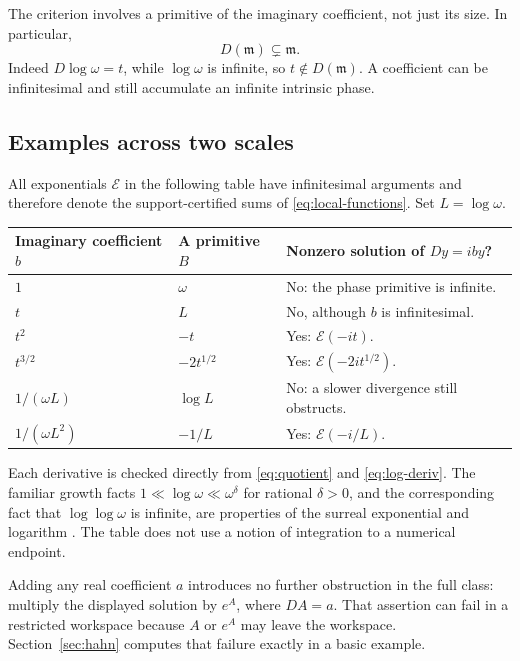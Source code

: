\documentclass[11pt,a4paper]{article}
\numberwithin{equation}{section}
\theoremstyle{definition}
\theoremstyle{remark}
\newcommand{\mm}{\mathfrak m}
\newcommand{\EE}{\mathcal E}
\begin{document}
The criterion involves a primitive of the imaginary coefficient, not just
its size. In particular,
\begin{equation}\label{eq:strict-small}
 D(\mm)\subsetneq\mm.
\end{equation}
Indeed $D\log\omega=t$, while $\log\omega$ is infinite, so
$t\notin D(\mm)$. A coefficient can be infinitesimal and still accumulate
an infinite intrinsic phase.

\subsection{Examples across two scales}

All exponentials $\EE$ in the following table have infinitesimal arguments
and therefore denote the support-certified sums of
\eqref{eq:local-functions}. Set $L=\log\omega$.

\begin{center}
\small
\begin{tabular}{@{}p{}p{}p{}@{}}
\toprule
Imaginary coefficient $b$ & A primitive $B$ & Nonzero solution of $Dy=iby$?\\
\midrule
$1$ & $\omega$ & No: the phase primitive is infinite.\\[4pt]
$t$ & $L$ & No, although $b$ is infinitesimal.\\[4pt]
$t^2$ & $-t$ & Yes: $\EE(-it)$.\\[4pt]
$t^{3/2}$ & $-2t^{1/2}$ & Yes: $\EE(-2it^{1/2})$.\\[4pt]
$1/(\omega L)$ & $\log L$ & No: a slower divergence still obstructs.\\[4pt]
$1/(\omega L^2)$ & $-1/L$ & Yes: $\EE(-i/L)$.\\
\bottomrule
\end{tabular}
\end{center}

Each derivative is checked directly from \eqref{eq:quotient} and
\eqref{eq:log-deriv}. The familiar growth facts
$1\ll\log\omega\ll\omega^\delta$ for rational $\delta>0$, and the
corresponding fact that $\log\log\omega$ is infinite, are properties of the
surreal exponential and logarithm \cite{Gonshor}. The table does not use a
notion of integration to a numerical endpoint.

Adding any real coefficient $a$ introduces no further obstruction in the
full class: multiply the displayed solution by $e^A$, where $DA=a$.
That assertion can fail in a restricted workspace because $A$ or $e^A$
may leave the workspace. Section~\ref{sec:hahn} computes that failure
exactly in a basic example.
\end{document}
